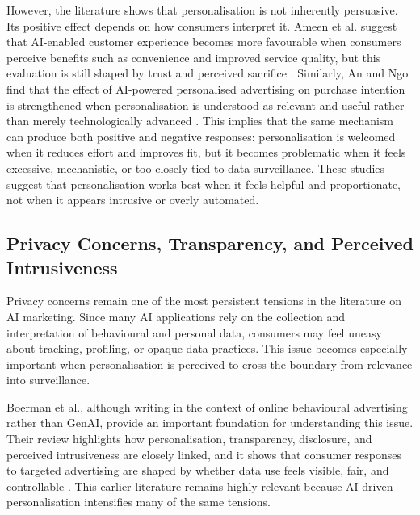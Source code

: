 However, the literature shows that personalisation is not inherently persuasive. Its positive effect depends on how consumers interpret it. Ameen et al. suggest that AI-enabled customer experience becomes more favourable when consumers perceive benefits such as convenience and improved service quality, but this evaluation is still shaped by trust and perceived sacrifice \cite{ameen2021customer}. Similarly, An and Ngo find that the effect of AI-powered personalised advertising on purchase intention is strengthened when personalisation is understood as relevant and useful rather than merely technologically advanced \cite{an2025personalized}. This implies that the same mechanism can produce both positive and negative responses: personalisation is welcomed when it reduces effort and improves fit, but it becomes problematic when it feels excessive, mechanistic, or too closely tied to data surveillance. These studies suggest that personalisation works best when it feels helpful and proportionate, not when it appears intrusive or overly automated.

\subsection{Privacy Concerns, Transparency, and Perceived Intrusiveness}
Privacy concerns remain one of the most persistent tensions in the literature on AI marketing. Since many AI applications rely on the collection and interpretation of behavioural and personal data, consumers may feel uneasy about tracking, profiling, or opaque data practices. This issue becomes especially important when personalisation is perceived to cross the boundary from relevance into surveillance.

Boerman et al., although writing in the context of online behavioural advertising rather than GenAI, provide an important foundation for understanding this issue. Their review highlights how personalisation, transparency, disclosure, and perceived intrusiveness are closely linked, and it shows that consumer responses to targeted advertising are shaped by whether data use feels visible, fair, and controllable \cite{boerman2017oba}. This earlier literature remains highly relevant because AI-driven personalisation intensifies many of the same tensions.

